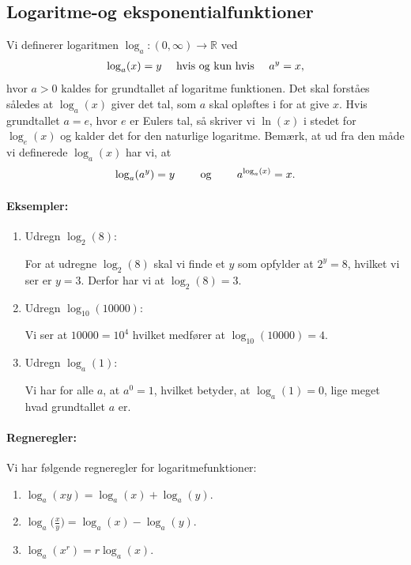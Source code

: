 \subsection{Logaritme-og eksponentialfunktioner}
Vi definerer logaritmen $\log_a \colon (0,\infty) \to \mathbb{R}$ ved
\begin{align*}
\log_a(x) = y \quad \textup{ hvis og kun hvis } \quad a^y=x,
\end{align*}
hvor $a>0$ kaldes for grundtallet af logaritme funktionen. Det skal forståes således at $\log_a(x)$ giver det tal, som $a$ skal opløftes i for at give $x$. Hvis grundtallet $a=e$, hvor $e$ er Eulers tal, så skriver vi $\ln(x)$ i stedet for $\log_e(x)$ og kalder det for den naturlige logaritme. Bemærk, at ud fra den måde vi definerede $\log_a(x)$ har vi, at
\begin{align}\label{eq:funktioner4et}
\log_a(a^y)=y \qquad \textup{ og } \qquad a^{\log_a(x)}=x.
\end{align}

\paragraph*{Eksempler:}
\begin{enumerate}
\item Udregn $\log_2(8)$:

For at udregne $\log_2(8)$ skal vi finde et $y$ som opfylder at $2^y=8$, hvilket vi ser er $y=3$. Derfor har vi at $\log_2(8)=3$.
\item Udregn $\log_{10}(10000)$:

Vi ser at $10000=10^4$ hvilket medfører at $\log_{10}(10000)=4$.
\item Udregn $\log_a(1)$:

Vi har for alle $a$, at $a^0=1$, hvilket betyder, at $\log_a(1)=0$, lige meget hvad grundtallet $a$ er.
\end{enumerate}

\paragraph*{Regneregler:}
Vi har følgende regneregler for logaritmefunktioner:
\begin{enumerate}
\item $\log_a(xy)=\log_a(x)+\log_a(y)$.
\item $\log_a\big(\frac{x}{y}\big) = \log_a(x)-\log_a(y)$.
\item $\log_a(x^r) = r\log_a(x)$.
\end{enumerate}

